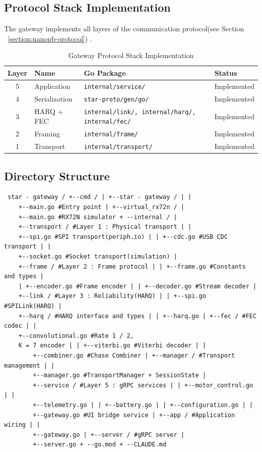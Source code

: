 \subsection{Protocol Stack Implementation}

The gateway implements all layers of the communication
protocol(see Section ~\ref{section:nanopb-protocol})
    .

\begin{table}[H]
\centering
\caption{Gateway Protocol Stack Implementation}
\label{tab:gateway-stack}
\begin{tabular}{|c|l|l|l|}
\hline
\textbf{Layer} & \textbf{Name} & \textbf{Go Package} & \textbf{Status} \\
\hline
5 & Application & \texttt{internal/service/} & Implemented \\
4 & Serialization & \texttt{star-proto/gen/go/} & Implemented \\
3 & HARQ + FEC & \texttt{internal/link/, internal/harq/, internal/fec/} & Implemented \\
2 & Framing & \texttt{internal/frame/} & Implemented \\
1 & Transport & \texttt{internal/transport/} & Implemented \\
\hline
\end{tabular}
\end{table}

\subsection{Directory Structure}

\begin{verbatim} star - gateway / +--cmd / | +--star - gateway / | |
    +--main.go #Entry point | +--virtual_rx72n / |
    +--main.go #RX72N simulator + --internal / |
    +--transport / #Layer 1 : Physical transport | |
    +--spi.go #SPI transport(periph.io) | | +--cdc.go #USB CDC transport | |
    +--socket.go #Socket transport(simulation) |
    +--frame / #Layer 2 : Frame protocol | | +--frame.go #Constants and types |
    | +--encoder.go #Frame encoder | | +--decoder.go #Stream decoder |
    +--link / #Layer 3 : Reliability(HARQ) | | +--spi.go #SPILink(HARQ) |
    +--harq / #HARQ interface and types | | +--harq.go | +--fec / #FEC codec | |
    +--convolutional.go #Rate 1 / 2,
    K = 7 encoder | | +--viterbi.go #Viterbi decoder | |
        +--combiner.go #Chase Combiner | +--manager / #Transport management | |
        +--manager.go #TransportManager + SessionState |
        +--service / #Layer 5 : gRPC services | | +--motor_control.go | |
        +--telemetry.go | | +--battery.go | | +--configuration.go | |
        +--gateway.go #UI bridge service | +--app / #Application wiring | |
        +--gateway.go | +--server / #gRPC server |
        +--server.go + --go.mod + --CLAUDE.md
\end{verbatim}

